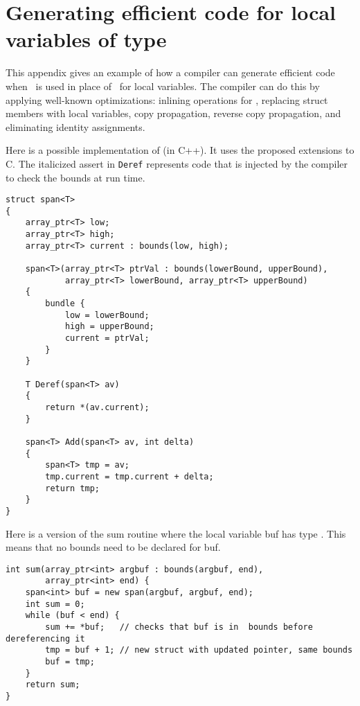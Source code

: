 
\chapter{Generating efficient code for local variables of type \spanptr}

This appendix gives an example of how a compiler can generate efficient
code when \spanptr\ is used in place of \arrayptr\
for local variables. The compiler can do this by applying well-known
optimizations: inlining operations for \spanptr , replacing
struct members with local variables, copy propagation, reverse copy
propagation, and eliminating identity assignments.

Here is a possible implementation of \spanptrT (in C++). It
uses the proposed extensions to C. The italicized assert in
\texttt{Deref} represents code that is injected by the compiler to check
the bounds at run time.

\begin{verbatim}
struct span<T>
{
    array_ptr<T> low;
    array_ptr<T> high;
    array_ptr<T> current : bounds(low, high);
      
    span<T>(array_ptr<T> ptrVal : bounds(lowerBound, upperBound),
            array_ptr<T> lowerBound, array_ptr<T> upperBound)
    {
        bundle {
            low = lowerBound;
            high = upperBound;
            current = ptrVal;
        }
    }

    T Deref(span<T> av) 
    {
        return *(av.current);
    }

    span<T> Add(span<T> av, int delta) 
    {
        span<T> tmp = av;
        tmp.current = tmp.current + delta;
        return tmp;
    }
}
\end{verbatim}

Here is a version of the sum routine where the local variable buf has
type \spanptr. This means that no bounds need to be declared
for buf.

\begin{verbatim}
int sum(array_ptr<int> argbuf : bounds(argbuf, end), 
        array_ptr<int> end) {
    span<int> buf = new span(argbuf, argbuf, end);
    int sum = 0;
    while (buf < end) {
        sum += *buf;   // checks that buf is in  bounds before dereferencing it        
        tmp = buf + 1; // new struct with updated pointer, same bounds
        buf = tmp;
    }
    return sum;
}
\end{verbatim}


